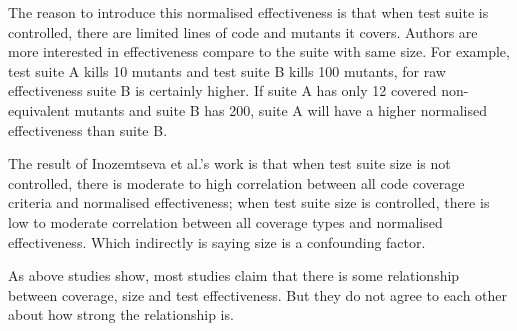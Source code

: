 The reason to introduce this normalised effectiveness is that when test suite is controlled, there are limited lines of code and mutants it covers. Authors are more interested in effectiveness compare to the suite with same size. For example, test suite A kills 10 mutants and test suite B kills 100 mutants, for raw effectiveness suite B is certainly higher. If suite A has only 12 covered non-equivalent mutants and suite B has 200, suite A will have a higher normalised effectiveness than suite B.

The result of Inozemtseva et al.'s work is that when test suite size is not controlled, there is moderate to high correlation between all code coverage criteria and normalised effectiveness; when test suite size is controlled, there is low to moderate correlation between all coverage types and normalised effectiveness. Which indirectly is saying size is a confounding factor.

As above studies show, most studies claim that there is some relationship between coverage, size and test effectiveness. But they do not agree to each other about how strong the relationship is.